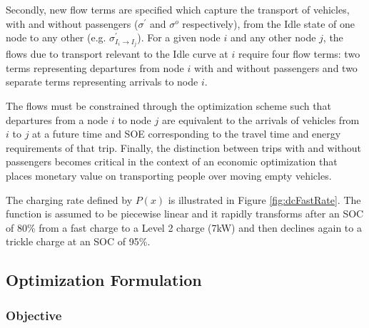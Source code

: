 \documentclass[journal]{IEEEtran}
\begin{document}
Secondly, new flow terms are specified which capture the transport of vehicles, with and without passengers ($\sigma^\prime$ and $\sigma^o$ respectively), from the Idle state of one node to any other (e.g. $\sigma_{I_i \rightarrow I_j}^\prime$). For a given node $i$ and any other node $j$, the flows due to transport relevant to the Idle curve at $i$ require four flow terms: two terms representing departures from node $i$ with and without passengers and two separate terms representing arrivals to node $i$. 

The flows must be constrained through the optimization scheme such that departures from a node $i$ to node $j$ are equivalent to the arrivals of vehicles from $i$ to $j$ at a future time and SOE corresponding to the travel time and energy requirements of that trip. Finally, the distinction between trips with and without passengers becomes critical in the context of an economic optimization that places monetary value on transporting people over moving empty vehicles.

The charging rate defined by $P(x)$ is illustrated in Figure \ref{fig:dcFastRate}. The function is assumed to be piecewise linear and it rapidly transforms after an SOC of 80\% from a fast charge to a Level 2 charge (7kW) and then declines again to a trickle charge at an SOC of 95\%.


\subsection{Optimization Formulation}

\subsubsection{Objective}
~ \\
\end{document}
